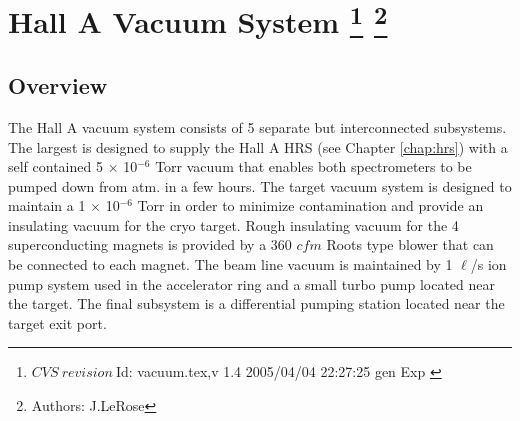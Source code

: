 \chapter[Hall A Vacuum System]{Hall A Vacuum System
\label{chap:vacuum}
\footnote{
  $CVS~revision~ $Id: vacuum.tex,v 1.4 2005/04/04 22:27:25 gen Exp $ $ 
}
\footnote{Authors: J.LeRose }
}
\section{Overview}

The Hall A vacuum system consists of 5 separate but interconnected 
subsystems.  The largest is designed to supply 
the Hall A HRS (see Chapter \ref{chap:hrs}) with a 
self contained 5 $\times$ 10$^{-6}$ Torr vacuum that enables both 
spectrometers to be pumped down from atm. in a few hours.  The target 
vacuum system is designed to maintain a 1 $\times$ 10$^{-6}$ Torr in 
order to minimize contamination and provide an insulating vacuum for the 
cryo target.  Rough insulating vacuum for the 4 superconducting magnets 
is provided by a 360 $cfm$ Roots type blower that can be connected to each 
magnet.  The beam line vacuum is maintained by 1 $\ell$/s ion pump 
system used in the accelerator ring and a small turbo pump located near 
the target.  The final subsystem is a differential pumping station 
located near the target exit port.

